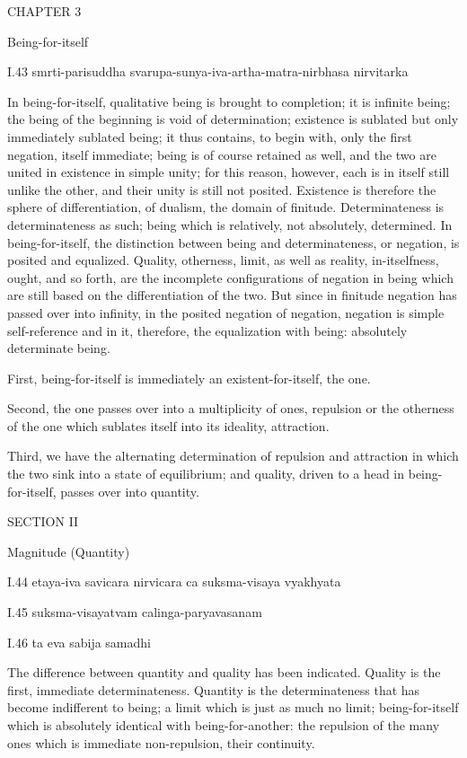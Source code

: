 CHAPTER 3

Being-for-itself

I.43
smrti-parisuddha svarupa-sunya-iva-artha-matra-nirbhasa nirvitarka

In being-for-itself,
qualitative being is brought to completion;
it is infinite being;
the being of the beginning is void of determination;
existence is sublated but only immediately sublated being;
it thus contains, to begin with,
only the first negation, itself immediate;
being is of course retained as well,
and the two are united in existence in simple unity;
for this reason, however,
each is in itself still unlike the other,
and their unity is still not posited.
Existence is therefore the sphere of differentiation,
of dualism, the domain of finitude.
Determinateness is determinateness as such;
being which is relatively, not absolutely, determined.
In being-for-itself, the distinction
between being and determinateness,
or negation, is posited and equalized.
Quality, otherness, limit, as well as reality,
in-itselfness, ought, and so forth, are the
incomplete configurations of negation in being
which are still based on the differentiation of the two.
But since in finitude negation has passed over into infinity,
in the posited negation of negation,
negation is simple self-reference
and in it, therefore, the equalization with being:
absolutely determinate being.

First, being-for-itself is immediately
an existent-for-itself, the one.

Second, the one passes over
into a multiplicity of ones,
repulsion or the otherness of the one
which sublates itself into its ideality, attraction.

Third, we have the alternating
determination of repulsion and attraction
in which the two sink into a state of equilibrium;
and quality, driven to a head in being-for-itself,
passes over into quantity.

SECTION II

Magnitude (Quantity)

I.44
etaya-iva savicara nirvicara ca suksma-visaya vyakhyata

I.45
suksma-visayatvam calinga-paryavasanam

I.46
ta eva sabija samadhi

The difference between quantity and quality has been indicated.
Quality is the first, immediate determinateness.
Quantity is the determinateness that
has become indifferent to being;
a limit which is just as much no limit;
being-for-itself which is absolutely
identical with being-for-another:
the repulsion of the many ones
which is immediate non-repulsion,
their continuity.

